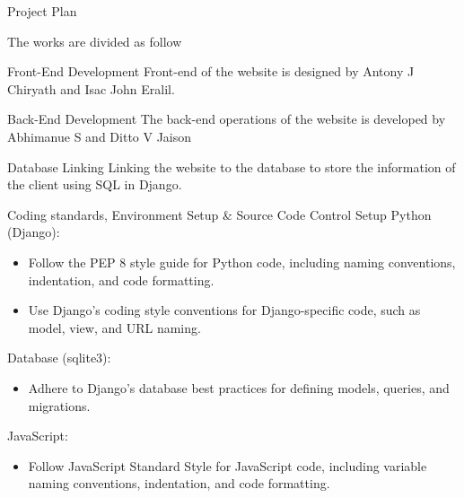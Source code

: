 \documentclass{beamer} %
\begin{document}
\begin{frame}[c]{Project Plan}
	
The works are divided as follow
\begin{block}{Front-End Development}
	Front-end of the website is designed by Antony J Chiryath and Isac John Eralil.
\end{block}

\begin{exampleblock}{Back-End Development}
	The back-end operations of the website is developed by Abhimanue S and Ditto V Jaison
\end{exampleblock}

\begin{alertblock}{Database Linking}
	Linking the website to the database to store the information of the client using SQL in Django.
\end{alertblock}

\end{frame}

\begin{frame}{Coding standards, Environment Setup & Source Code Control Setup}
    Python (Django):
    \begin{minipage}{1\textwidth}
            \begin{itemize}
\item Follow the PEP 8 style guide for Python code, including naming conventions, indentation, and code formatting.
\item Use Django's coding style conventions for Django-specific code, such as model, view, and URL naming.
            \end{itemize}
Database (sqlite3):
\begin{itemize}
    \item Adhere to Django's database best practices for defining models, queries, and migrations.
\end{itemize}
JavaScript:
\begin{itemize}
    \item Follow JavaScript Standard Style for JavaScript code, including variable naming conventions, indentation, and code formatting.
\end{itemize}
        \end{minipage} 
\end{frame}

    
               
\end{document}

